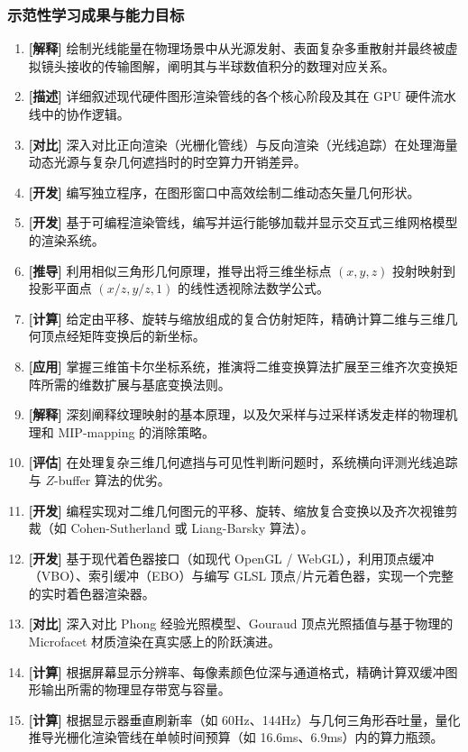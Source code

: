 \subsubsection{示范性学习成果与能力目标}
\begin{enumerate}
    \item \textbf{[解释]} 绘制光线能量在物理场景中从光源发射、表面复杂多重散射并最终被虚拟镜头接收的传输图解，阐明其与半球数值积分的数理对应关系。
    \item \textbf{[描述]} 详细叙述现代硬件图形渲染管线的各个核心阶段及其在 GPU 硬件流水线中的协作逻辑。
    \item \textbf{[对比]} 深入对比正向渲染（光栅化管线）与反向渲染（光线追踪）在处理海量动态光源与复杂几何遮挡时的时空算力开销差异。
    \item \textbf{[开发]} 编写独立程序，在图形窗口中高效绘制二维动态矢量几何形状。
    \item \textbf{[开发]} 基于可编程渲染管线，编写并运行能够加载并显示交互式三维网格模型的渲染系统。
    \item \textbf{[推导]} 利用相似三角形几何原理，推导出将三维坐标点 $(x, y, z)$ 投射映射到投影平面点 $(x/z, y/z, 1)$ 的线性透视除法数学公式。
    \item \textbf{[计算]} 给定由平移、旋转与缩放组成的复合仿射矩阵，精确计算二维与三维几何顶点经矩阵变换后的新坐标。
    \item \textbf{[应用]} 掌握三维笛卡尔坐标系统，推演将二维变换算法扩展至三维齐次变换矩阵所需的维数扩展与基底变换法则。
    \item \textbf{[解释]} 深刻阐释纹理映射的基本原理，以及欠采样与过采样诱发走样的物理机理和 MIP-mapping 的消除策略。
    \item \textbf{[评估]} 在处理复杂三维几何遮挡与可见性判断问题时，系统横向评测光线追踪与 $Z$-buffer 算法的优劣。
    \item \textbf{[开发]} 编程实现对二维几何图元的平移、旋转、缩放复合变换以及齐次视锥剪裁（如 Cohen-Sutherland 或 Liang-Barsky 算法）。
    \item \textbf{[开发]} 基于现代着色器接口（如现代 OpenGL / WebGL），利用顶点缓冲（VBO）、索引缓冲（EBO）与编写 GLSL 顶点/片元着色器，实现一个完整的实时着色器渲染器。
    \item \textbf{[对比]} 深入对比 Phong 经验光照模型、Gouraud 顶点光照插值与基于物理的 Microfacet 材质渲染在真实感上的阶跃演进。
    \item \textbf{[计算]} 根据屏幕显示分辨率、每像素颜色位深与通道格式，精确计算双缓冲图形输出所需的物理显存带宽与容量。
    \item \textbf{[计算]} 根据显示器垂直刷新率（如 60Hz、144Hz）与几何三角形吞吐量，量化推导光栅化渲染管线在单帧时间预算（如 16.6ms、6.9ms）内的算力瓶颈。
\end{enumerate}

